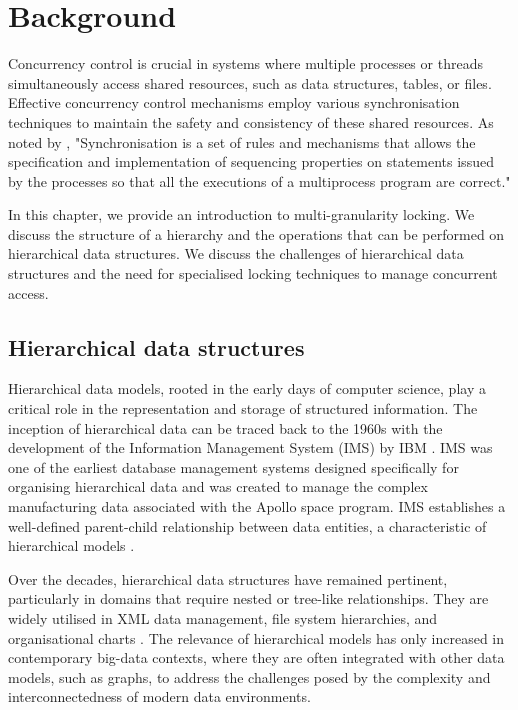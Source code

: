 %

\chapter{Background} \label{chap:background}

\minitoc

Concurrency control is crucial in systems where multiple processes or threads simultaneously access shared resources, such as data structures, tables, or files. 
Effective concurrency control mechanisms employ various synchronisation techniques to maintain the safety and consistency of these shared resources. As noted by \citet{DBLP:books/daglib/0030596}, "Synchronisation is a set of rules and mechanisms that allows the specification and implementation of sequencing properties on statements issued by the processes so that all the executions of a multiprocess program are correct."

In this chapter, we provide an introduction to multi-granularity locking. We discuss the structure of a hierarchy and the operations that can be performed on hierarchical data structures. We discuss the challenges of hierarchical data structures and the need for specialised locking techniques to manage concurrent access. 



\section{Hierarchical data structures}

Hierarchical data models, rooted in the early days of computer science, play a critical role in the representation and storage of structured information. The inception of hierarchical data can be traced back to the 1960s with the development of the Information Management System (IMS) by IBM \cite{IBMIMS}. IMS was one of the earliest database management systems designed specifically for organising hierarchical data and was created to manage the complex manufacturing data associated with the Apollo space program. IMS establishes a well-defined parent-child relationship between data entities, a characteristic of hierarchical models \cite{DBLP:books/daglib/0006734}.

Over the decades, hierarchical data structures have remained pertinent, particularly in domains that require nested or tree-like relationships. They are widely utilised in XML data management, file system hierarchies, and organisational charts \cite{DBLP:books/mk/BunemanSA99}. The relevance of hierarchical models has only increased in contemporary big-data contexts, where they are often integrated with other data models, such as graphs, to address the challenges posed by the complexity and interconnectedness of modern data environments.


